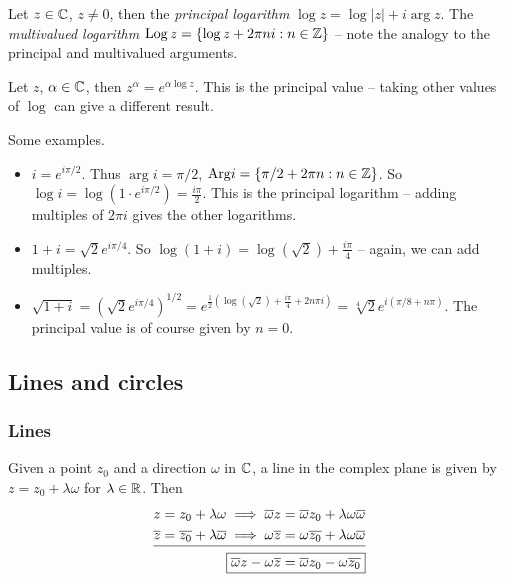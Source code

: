 \documentclass{../template/note}
\begin{document}
    \begin{definition}
        Let \(z \in \mathbb C\), \(z \neq 0\), then the \emph{principal logarithm} \(\log z = \log|z| + i \arg{z}\). The \emph{multivalued logarithm} \(\operatorname{Log} z = \{\log z + 2\pi n i : n \in \mathbb Z\}\) -- note the analogy to the principal and multivalued arguments.
    \end{definition}
    
    \begin{definition}
        Let \(z\), \(\alpha \in \mathbb C\), then \(z^\alpha = e^{\alpha \log z}\). This is the principal value -- taking other values of \(\log\) can give a different result.
    \end{definition}
    
    \begin{example} Some examples.
        \begin{itemize}
            \item \(i = e^{i\pi/2}\). Thus \(\arg i = \pi / 2\), \(\mathrm{Arg} i = \{\pi/2 + 2\pi n : n \in \mathbb Z\}\). So \(\log i = \log (1 \cdot e^{i\pi/2}) = \frac{i\pi}{2}\). This is the principal logarithm -- adding multiples of \(2 \pi i\) gives the other logarithms.
            \item \(1 + i = \sqrt 2 e^{i \pi /4}\). So \(\log(1 + i) = \log(\sqrt 2) + \frac{i \pi}{4}\) -- again, we can add multiples.
            \item \(\sqrt{1+i} = (\sqrt 2 e^{i \pi /4})^{1/2} = e^{\frac{1}{2}\left(\log(\sqrt 2) + \frac{i \pi}{4}+2n\pi i\right)} = \sqrt[4]{2} e^{i \left(\pi/8 + n \pi\right)}\). The principal value is of course given by \(n = 0\).
        \end{itemize}
        
        
    \end{example}
    
    \subsection{Lines and circles}

    \subsubsection{Lines}

    Given a point \(z_0\) and a direction \(\omega\) in \(\mathbb C\), a line in the complex plane is given by \(z = z_0 + \lambda \omega\) for \(\lambda \in \mathbb R\). Then
    \begin{align*}
        z = z_0 + \lambda \omega \implies \overline \omega z &= \overline \omega z_0 + \lambda \omega \overline \omega \\
        \overline z = \overline{z_0} + \lambda \overline \omega \implies \omega \overline z &= \omega \overline{z_0} + \lambda \omega \overline \omega \\[-10pt]
        \cline{1-2}
        \Aboxed{\overline{\omega}z-\omega\overline{z} &= \overline{\omega}z_0-\omega\overline{z_0}}
    \end{align*}
\end{document}
